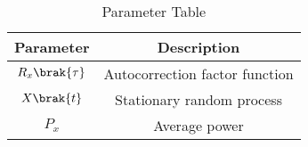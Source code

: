 
\begin{table}[ht]
  \centering
  \begin{tabular}{|c|c|}
    \hline
    Parameter & Description  \\
    \hline
     $R_x\brak{\tau}$ & Autocorrection factor function \\
     \hline
     $ X\brak{t}$ & Stationary random process \\
    \hline
    $ P_x$ & Average power\\
    \hline
  \end{tabular}
  \vspace{2mm}
  \caption{Parameter Table}
\end{table}

